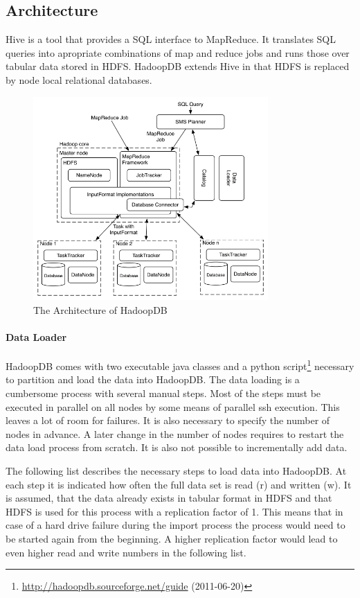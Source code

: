 \documentclass[12pt,a4paper]{scrartcl}		%
\newcommand{\citeurl}[2]{\url{#1} (#2)}
\begin{document}
\subsection{Architecture}
Hive is a tool that provides a SQL interface to MapReduce. It translates SQL queries into apropriate combinations of map and reduce jobs and runs those over tabular data stored in HDFS. HadoopDB extends Hive in that HDFS is replaced by node local relational databases.

\begin{figure}[t]
  \centering
  \includegraphics[width=0.8\textwidth]{images/hadoopdb-arch.png}
  \caption{The Architecture of HadoopDB\cite{journals/pvldb/AbouzeidBARS09}}
  \label{fig:hadoopdbarch}
\end{figure}

\paragraph{Data Loader}
HadoopDB comes with two executable java classes and a python script\footnote{\citeurl{http://hadoopdb.sourceforge.net/guide}{2011-06-20}} necessary to partition and load the data into HadoopDB. The data loading is a cumbersome process with several manual steps. Most of the steps must be executed in parallel on all nodes by some means of parallel ssh execution. This leaves a lot of room for failures. It is also necessary to specify the number of nodes in advance. A later change in the number of nodes requires to restart the data load process from scratch. It is also not possible to incrementally add data.

The following list describes the necessary steps to load data into HadoopDB. At each step it is indicated how often the full data set is read (r) and written (w). It is assumed, that the data already exists in tabular format in HDFS and that HDFS is used for this process with a replication factor of 1. This means that in case of a hard drive failure during the import process the process would need to be started again from the beginning. A higher replication factor would lead to even higher read and write numbers in the following list.
\end{document}
